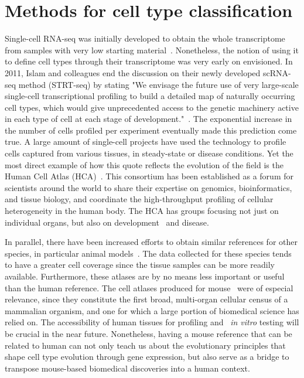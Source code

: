 \section{Methods for cell type classification}  %
\label{section1.3}

Single-cell RNA-seq was initially developed to obtain the whole transcriptome from samples with very low starting material~\citep{tang_mrna-seq_2009}. Nonetheless, the notion of using it to define cell types through their transcriptome was very early on envisioned. In 2011, Islam and colleagues end the discussion on their newly developed scRNA-seq method (STRT-seq) by stating "We envisage the future use of very large-scale single-cell transcriptional profiling to build a detailed map of naturally occurring cell types, which would give unprecedented access to the genetic machinery active in each type of cell at each stage of development."~\citep{islam_characterization_2011}. The exponential increase in the number of cells profiled per experiment eventually made this prediction come true. A large amount of single-cell projects have used the technology to profile cells captured from various tissues, in steady-state or disease conditions. Yet the most direct example of how this quote reflects the evolution of the field is the Human Cell Atlas (HCA)~\citep{regev_human_2017}. This consortium has been established as a forum for scientists around the world to share their expertise on genomics, bioinformatics, and tissue biology, and coordinate the high-throughput profiling of cellular heterogeneity in the human body. The HCA has groups focusing not just on individual organs, but also on development~\citep{behjati_mapping_2018,taylor_pediatric_2019} and disease. 

In parallel, there have been increased efforts to obtain similar references for other species, in particular animal models~\citep{fincher_cell_2018,cao_comprehensive_2017}. The data collected for these species tends to have a greater cell coverage since the tissue samples can be more readily available. Furthermore, these atlases are by no means less important or useful than the human reference. The cell atlases produced for mouse~\citep{han_mapping_2018,noauthor_single-cell_2018} were of especial relevance, since they constitute the first broad, multi-organ cellular census of a mammalian organism, and one for which a large portion of biomedical science has relied on. The accessibility of human tissues for profiling and ~\textit{in vitro} testing will be crucial in the near future. Nonetheless, having a mouse reference that can be related to human can not only teach us about the evolutionary principles that shape cell type evolution through gene expression, but also serve as a bridge to transpose mouse-based biomedical discoveries into a human context.

